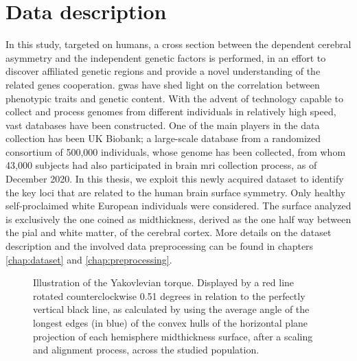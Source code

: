 \section{Data description}
In this study, targeted on humans, a cross section between the dependent cerebral asymmetry and the independent genetic factors is performed, in an effort to discover affiliated genetic regions and provide a novel understanding of the related genes cooperation. \Ac{gwas} have shed light on the correlation between phenotypic traits and genetic content. With the advent of technology capable to collect and process genomes from different individuals in relatively high speed, vast databases have been constructed. One of the main players in the data collection has been UK Biobank; a large-scale database from a randomized consortium of 500,000 individuals, whose genome has been collected, from whom  43,000 subjects had also participated in brain \ac{mri} collection process, as of December 2020. In this thesis, we exploit this newly acquired dataset to identify the key loci that are related to the human brain surface symmetry. Only healthy self-proclaimed white European individuals were considered. The surface analyzed is exclusively the one coined as midthickness, derived as the one half way between the pial and white matter, of the cerebral cortex. More details on the dataset description and the involved data preprocessing can be found in chapters \ref{chap:dataset} and \ref{chap:preprocessing}.

\begin{figure}
	\centering
	
	\caption{Illustration of the Yakovlevian torque. Displayed by a red line rotated counterclockwise 0.51 degrees in relation to the perfectly vertical black line, as calculated by using the average angle of the longest edges (in blue) of the convex hulls of the horizontal plane projection of each hemisphere midthickness surface, after a scaling and alignment process, across the studied population.}
	\label{fig:yaktorque}
\end{figure}

